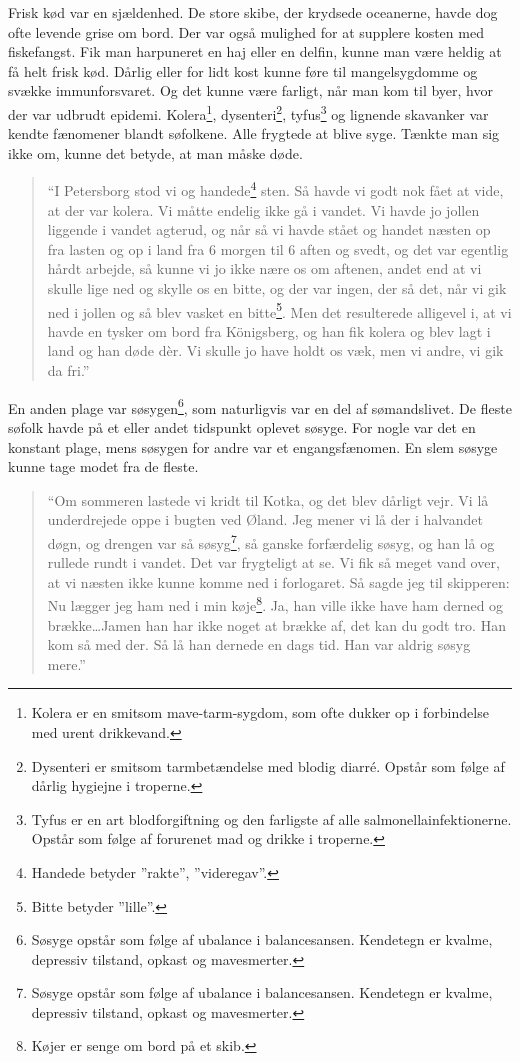 Frisk kød var en sjældenhed. De store skibe, der krydsede oceanerne,
havde dog ofte levende grise om bord. Der var også mulighed for at
supplere kosten med fiskefangst. Fik man harpuneret en haj eller en
delfin, kunne man være heldig at få helt frisk kød. Dårlig eller for
lidt kost kunne føre til mangelsygdomme og svække immunforsvaret. Og det
kunne være farligt, når man kom til byer, hvor der var udbrudt epidemi.
Kolera\footnote{Kolera er en smitsom mave-tarm-sygdom, som ofte dukker
  op i forbindelse med urent drikkevand.}, dysenteri\footnote{Dysenteri
  er smitsom tarmbetændelse med blodig diarré. Opstår som følge af
  dårlig hygiejne i troperne.}, tyfus\footnote{Tyfus er en art
  blodforgiftning og den farligste af alle salmonellainfektionerne.
  Opstår som følge af forurenet mad og drikke i troperne.} og lignende
skavanker var kendte fænomener blandt søfolkene. Alle frygtede at blive
syge. Tænkte man sig ikke om, kunne det betyde, at man måske døde.

\begin{quote}
``I Petersborg stod vi og handede\footnote{Handede betyder ''rakte'',
  ''videregav''.} sten. Så havde vi godt nok fået at vide, at der var
kolera. Vi måtte endelig ikke gå i vandet. Vi havde jo jollen liggende i
vandet agterud, og når så vi havde stået og handet næsten op fra lasten
og op i land fra 6 morgen til 6 aften og svedt, og det var egentlig
hårdt arbejde, så kunne vi jo ikke nære os om aftenen, andet end at vi
skulle lige ned og skylle os en bitte, og der var ingen, der så det, når
vi gik ned i jollen og så blev vasket en bitte\footnote{Bitte betyder
  ''lille''.}. Men det resulterede alligevel i, at vi havde en tysker om
bord fra Königsberg, og han fik kolera og blev lagt i land og han døde
dèr. Vi skulle jo have holdt os væk, men vi andre, vi gik da fri.''
\end{quote}

En anden plage var søsygen\footnote{Søsyge opstår som følge af ubalance
  i balancesansen. Kendetegn er kvalme, depressiv tilstand, opkast og
  mavesmerter.}, som naturligvis var en del af sømandslivet. De fleste
søfolk havde på et eller andet tidspunkt oplevet søsyge. For nogle var
det en konstant plage, mens søsygen for andre var et engangsfænomen. En
slem søsyge kunne tage modet fra de fleste.

\begin{quote}
``Om sommeren lastede vi kridt til Kotka, og det blev dårligt vejr. Vi
lå underdrejede oppe i bugten ved Øland. Jeg mener vi lå der i halvandet
døgn, og drengen var så søsyg\footnote{Søsyge opstår som følge af
  ubalance i balancesansen. Kendetegn er kvalme, depressiv tilstand,
  opkast og mavesmerter.}, så ganske forfærdelig søsyg, og han lå og
rullede rundt i vandet. Det var frygteligt at se. Vi fik så meget vand
over, at vi næsten ikke kunne komme ned i forlogaret. Så sagde jeg til
skipperen: Nu lægger jeg ham ned i min køje\footnote{Køjer er senge om
  bord på et skib.}. Ja, han ville ikke have ham derned og
brække\ldots Jamen han har ikke noget at brække af, det kan du godt tro.
Han kom så med der. Så lå han dernede en dags tid. Han var aldrig søsyg
mere.''
\end{quote}

